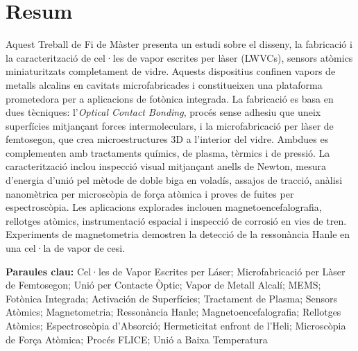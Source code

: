 \documentclass[11pt,english,a4paper,hidelinks]{book}
\begin{document}
\section*{Resum}
\noindent
Aquest Treball de Fi de Màster presenta un estudi sobre el disseny,
la fabricació i la caracterització de cel·les de vapor escrites per
làser (LWVCs), sensors atòmics miniaturitzats completament de vidre.
Aquests dispositius confinen vapors de metalls alcalins en cavitats
microfabricades i constitueixen una plataforma prometedora per a
aplicacions de fotònica integrada. La fabricació es basa en dues
tècniques: l'\textit{Optical Contact Bonding}, procés sense adhesiu
que uneix superfícies mitjançant forces intermoleculars, i la
microfabricació per làser de femtosegon, que crea microestructures 3D
a l'interior del vidre. Ambdues es complementen amb tractaments
químics, de plasma, tèrmics i de pressió. La caracterització inclou
inspecció visual mitjançant anells de Newton, mesura d'energia d'unió
pel mètode de doble biga en voladís, assajos de tracció, anàlisi
nanomètrica per microscòpia de força atòmica i proves de fuites per
espectroscòpia. Les aplicacions explorades inclouen
magnetoencefalografia, rellotges atòmics, instrumentació espacial i
inspecció de corrosió en vies de tren. Experiments de magnetometria
demostren la detecció de la ressonància Hanle en una cel·la de vapor
de cesi.

\vspace{0.8em}
\noindent\textbf{Paraules clau:}
Cel·les de Vapor Escrites per Láser; Microfabricació per Làser de
Femtosegon; Unió per Contacte Òptic; Vapor de Metall Alcalí; MEMS;
Fotònica Integrada; Activación de Superfícies; Tractament de Plasma;
Sensors Atòmics; Magnetometria; Ressonància Hanle;
Magnetoencefalografia; Rellotges Atòmics; Espectroscòpia d'Absorció;
Hermeticitat enfront de l'Heli; Microscòpia de Força Atòmica;
Procés FLICE; Unió a Baixa Temperatura

\end{document}

